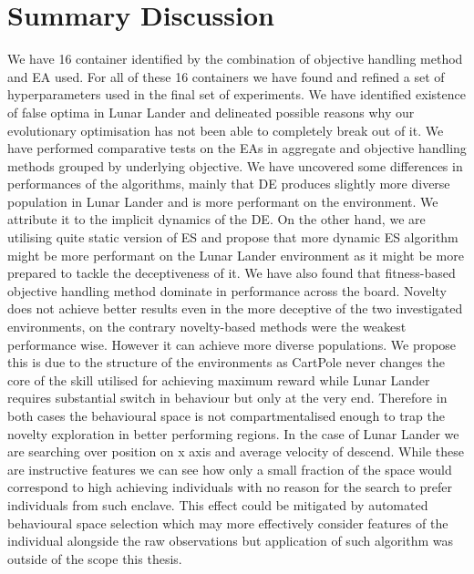 \section{Summary Discussion}
We have 16 container identified by the combination of objective handling method and EA used. For all of these 16 containers we have found and refined a set of hyperparameters used in the final set of experiments.
We have identified existence of false optima in Lunar Lander and delineated possible reasons why our evolutionary optimisation has not been able to completely break out of it.
We have performed comparative tests on the EAs in aggregate and objective handling methods grouped by underlying objective.
We have uncovered some differences in performances of the algorithms, mainly that DE produces slightly more diverse population in Lunar Lander and is more performant on the environment. We attribute it to the implicit dynamics of the DE. On the other hand, we are utilising quite static version of ES and propose that more dynamic ES algorithm might be more performant on the Lunar Lander environment as it might be more prepared to tackle the deceptiveness of it.  
We have also found that fitness-based objective handling method dominate in performance across the board. Novelty does not achieve better results even in the more deceptive of the two investigated environments, on the contrary novelty-based methods were the weakest performance wise. 
However it can achieve more diverse populations.
We propose this is due to the structure of the environments as CartPole never changes the core of the skill utilised for achieving maximum reward while Lunar Lander requires substantial switch in behaviour but only at the very end. Therefore in both cases the behavioural space is not compartmentalised enough to trap the novelty exploration in better performing regions. In the case of Lunar Lander we are searching over position on x axis and average velocity of descend. While these are instructive features we can see how only a small fraction of the space would correspond to high achieving individuals with no reason for the search to prefer individuals from such enclave.
This effect could be mitigated by automated behavioural space selection which may more effectively consider features of the individual alongside the raw observations but application of such algorithm was outside of the scope this thesis. \citep{policymanifold}











